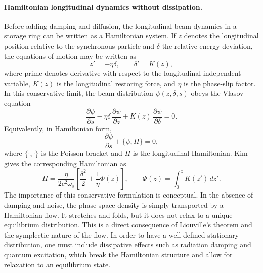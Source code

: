 \documentclass[11pt,a4paper]{article}
\begin{document}
\begin{sloppypar}
\paragraph{Hamiltonian longitudinal dynamics without dissipation.}
Before adding damping and diffusion, the longitudinal beam dynamics in a storage ring can be written as a Hamiltonian system. If $z$ denotes the longitudinal position relative to the synchronous particle and $\delta$ the relative energy deviation, the equations of motion may be written as
\begin{equation}
z' = -\eta \delta,
\qquad
\delta' = K(z),
\label{eq:long_eq_motion}
\end{equation}
where prime denotes derivative with respect to the longitudinal independent variable, $K(z)$ is the longitudinal restoring force, and $\eta$ is the phase-slip factor. In this conservative limit, the beam distribution $\psi(z,\delta,s)$ obeys the Vlasov equation
\begin{equation}
\frac{\partial \psi}{\partial s}
-
\eta\delta\,\frac{\partial \psi}{\partial z}
+
K(z)\,\frac{\partial \psi}{\partial \delta}
=0.
\label{eq:vlasov}
\end{equation}
Equivalently, in Hamiltonian form,
\begin{equation}
\frac{\partial \psi}{\partial s} + \{\psi,H\}=0,
\label{eq:vlasov_hamiltonian}
\end{equation}
where $\{\cdot,\cdot\}$ is the Poisson bracket and $H$ is the longitudinal Hamiltonian. Kim \cite{kim_mbtrack2_cuda_2025} gives the corresponding Hamiltonian as
\begin{equation}
H
=
\frac{\eta}{2c^2\omega_s}
\left[
\frac{\delta^2}{2}
+
\frac{1}{\eta}\Phi(z)
\right],
\qquad
\Phi(z)=\int_0^z K(z')\,dz'.
\label{eq:long_ham}
\end{equation}
The importance of this conservative formulation is conceptual. In the absence of damping and noise, the phase-space density is simply transported by a Hamiltonian flow. It stretches and folds, but it does not relax to a unique equilibrium distribution. This is a direct consequence of Liouville’s theorem and the symplectic nature of the flow. In order to have a well-defined stationary distribution, one must include dissipative effects such as radiation damping and quantum excitation, which break the Hamiltonian structure and allow for relaxation to an equilibrium state. 


\end{sloppypar}
\end{document}

